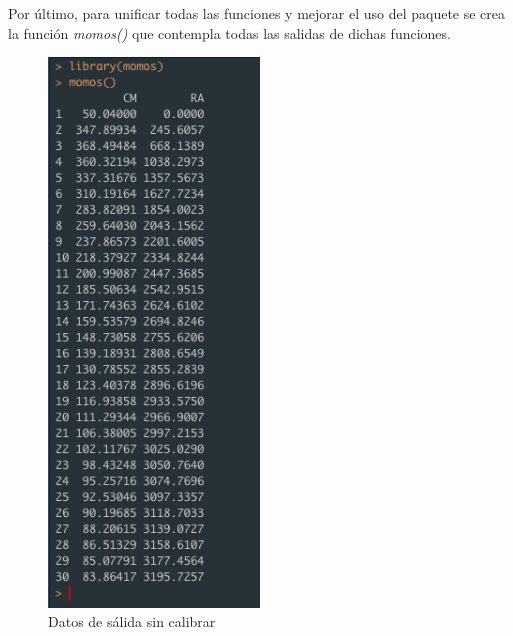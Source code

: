 Por \'ultimo, para unificar todas las funciones y mejorar el uso del paquete se crea la funci\'on \textit{momos()} que contempla todas las salidas de dichas funciones.

\begin{figure}[H]
    \centering
      \begin{minipage}{0.75\textwidth}
        \centering
        \includegraphics[width=0.5\textwidth]{figure_4_7.png}
        \caption{Datos de s\'alida sin calibrar}
        \label{fig:Fig}
      \end{minipage}%
      \hspace{5mm}
\end{figure}

